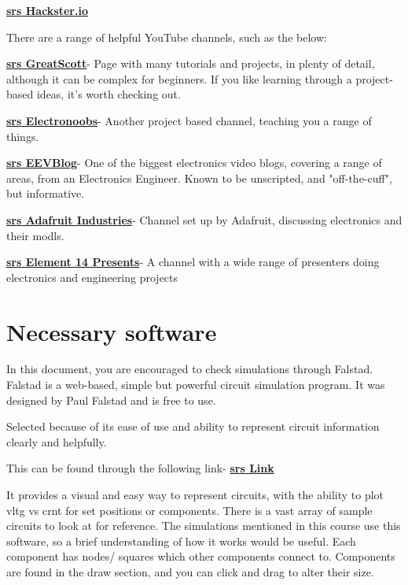 \documentclass[a4paper,11pt]{report}
\let\oldhref\href %
\renewcommand{\href}[2]{\oldhref{#1}{\bf\gls{srs} #2}}
\begin{document}
\href{https://www.hackster.io/}{Hackster.io}

There are a range of helpful YouTube channels, such as the below:

\href{https://www.youtube.com/c/greatscottlab}{GreatScott}- Page with many tutorials and projects, in plenty of detail, although it can be complex for beginners. If you like learning through a project-based ideas, it's worth checking out.

\href{https://www.youtube.com/c/ELECTRONOOBS}{Electronoobs}- Another project based channel, teaching you a range of things.

\href{https://www.youtube.com/c/EevblogDave}{EEVBlog}- One of the biggest electronics video blogs, covering a range of areas, from an Electronics Engineer. Known to be unscripted, and "off-the-cuff", but informative.

\href{https://www.youtube.com/c/adafruit}{Adafruit Industries}- Channel set up by Adafruit, discussing electronics and their \gls{modl}s.

\href{https://www.youtube.com/c/element14presents/videos}{Element 14 Presents}- A channel with a wide range of presenters doing electronics and engineering projects

\pagebreak

\section{Necessary software}

In this document, you are encouraged to check simulations through Falstad. Falstad is a web-based, simple but powerful circuit simulation program. It was designed by Paul Falstad and is free to use.

Selected because of its ease of use and ability to represent circuit information clearly and helpfully.

This can be found through the following link- \href{https://falstad.com/circuit/}{Link}

It provides a visual and easy way to represent circuits, with the ability to plot \gls{vltg} vs \gls{crnt} for set positions or components. There is a vast array of sample circuits to look at for reference. The simulations mentioned in this course use this software, so a brief understanding of how it works would be useful. Each component has nodes/ squares which other components connect to. Components are found in the draw section, and you can click and drag to alter their size.
\end{document}
